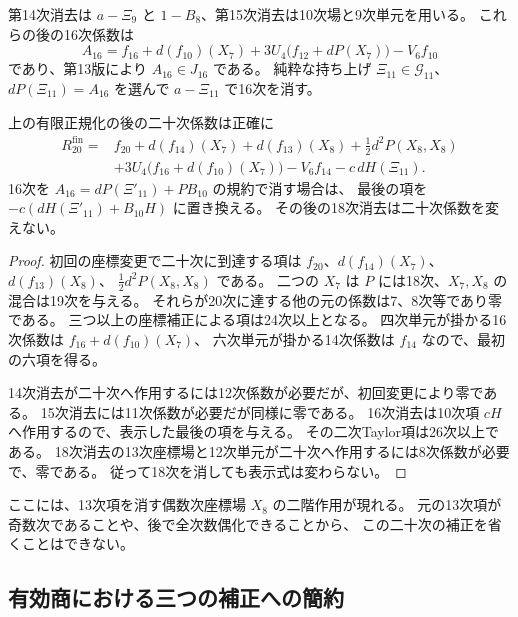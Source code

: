 第14次消去は $a-\Xi_9$ と $1-B_8$、第15次消去は10次場と9次単元を用いる。
これらの後の16次係数は
\begin{equation}\label{eq:v15-sixteenth-input}
 A_{16}=f_{16}+d(f_{10})(X_7)
             +3U_4\bigl(f_{12}+dP(X_7)\bigr)-V_6f_{10}
\end{equation}
であり、第13版により $A_{16}\in J_{16}$ である。
純粋な持ち上げ $\Xi_{11}\in\mathcal G_{11}$、
$dP(\Xi_{11})=A_{16}$ を選んで $a-\Xi_{11}$ で16次を消す。

\begin{proposition}[二十次の有限正規化補正式]
\label{prop:v15-exact-twentieth-correction}
上の有限正規化の後の二十次係数は正確に
\begin{equation}\label{eq:v15-exact-twentieth-correction}
 \begin{split}
 R_{20}^{\mathrm{fin}}={}&f_{20}+d(f_{14})(X_7)+d(f_{13})(X_8)
       +\frac12d^2P(X_8,X_8)\\
   &+3U_4\bigl(f_{16}+d(f_{10})(X_7)\bigr)-V_6f_{14}
       -c\,dH(\Xi_{11}).
 \end{split}
\end{equation}
16次を $A_{16}=dP(\Xi'_{11})+PB_{10}$ の規約で消す場合は、
最後の項を $-c(dH(\Xi'_{11})+B_{10}H)$ に置き換える。
その後の18次消去は二十次係数を変えない。
\end{proposition}

\begin{proof}
初回の座標変更で二十次に到達する項は
$f_{20}$、$d(f_{14})(X_7)$、$d(f_{13})(X_8)$、
$\tfrac12d^2P(X_8,X_8)$ である。
二つの $X_7$ は $P$ には18次、$X_7,X_8$ の混合は19次を与える。
それらが20次に達する他の元の係数は7、8次等であり零である。
三つ以上の座標補正による項は24次以上となる。
四次単元が掛かる16次係数は $f_{16}+d(f_{10})(X_7)$、
六次単元が掛かる14次係数は $f_{14}$ なので、最初の六項を得る。

14次消去が二十次へ作用するには12次係数が必要だが、初回変更により零である。
15次消去には11次係数が必要だが同様に零である。
16次消去は10次項 $cH$ へ作用するので、表示した最後の項を与える。
その二次Taylor項は26次以上である。
18次消去の13次座標場と12次単元が二十次へ作用するには8次係数が必要で、零である。
従って18次を消しても表示式は変わらない。
\end{proof}

ここには、13次項を消す偶数次座標場 $X_8$ の二階作用が現れる。
元の13次項が奇数次であることや、後で全次数偶化できることから、
この二十次の補正を省くことはできない。

\subsection{有効商における三つの補正への簡約}

